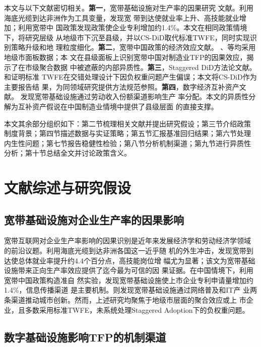 \documentclass[12pt, a4paper]{article}
\begin{document}
本文与以下文献密切相关。\textbf{第一}，宽带基础设施对生产率的因果研究
文献。\citet{hjort2019arrival}利用海底光缆到达非洲作为工具变量，发现宽
带到达使就业率上升、高技能就业增加；\citet{cui2022broadband}利用宽带中
国政策发现政策使企业专利增加约1.4\%。本文在相同政策情境下，将研究层级
从地级市下沉至县级，并以CS-DiD取代标准TWFE，同时实现识别策略升级和地
理粒度细化。\textbf{第二}，宽带中国政策的经济效应文献。
\citet{tan2022digital}、\citet{zhao2024city}等均采用地级市面板数据；本
文在县级面板上识别宽带中国对制造业TFP的因果效应，揭示了在市级聚合数据
中被遮蔽的内部异质性。\textbf{第三}，Staggered DiD方法论文献。
\citet{callaway2021difference}和\citet{goodman2021difference}证明标准
TWFE在交错处理设计下因负权重问题产生偏误；本文将CS-DiD作为主要报告结
果，为同领域研究提供方法规范参照。\textbf{第四}，数字经济互补资产文献。
\citet{liang2024broadband}发现宽带基础设施通过劳动收入份额渠道影响生产
率分配。本文的异质性分解为互补资产假说在中国制造业情境中提供了县级层面
的直接支撑。

本文其余部分组织如下：第二节梳理相关文献并提出研究假设；第三节介绍政策
制度背景；第四节描述数据与实证策略；第五节汇报基准回归结果；第六节处理
内生性问题；第七节报告稳健性检验；第八节分析机制渠道；第九节进行异质性
分析；第十节总结全文并讨论政策含义。

\section{文献综述与研究假设}

\subsection{宽带基础设施对企业生产率的因果影响}

宽带互联网对企业生产率影响的因果识别是近年来发展经济学和劳动经济学领域
的前沿议题。\citet{hjort2019arrival}利用海底光缆到达非洲各国这一近乎随
机的外生冲击，发现宽带到达使总体就业率提升约4.4个百分点，高技能岗位增
幅尤为显著；该文为宽带基础设施带来正向生产率效应提供了迄今最为可信的因
果证据。在中国情境下，\citet{cui2022broadband}利用宽带中国政策构造准自
然实验，发现宽带基础设施使上市企业专利申请量增加约1.4\%，信息传播渠道
是主要机制。\citet{tan2022digital}则发现宽带基础设施通过网络普及和IT产
业两条渠道推动城市创新。然而，上述研究均聚焦于地级市层面的聚合效应或上
市企业，且多数采用标准TWFE，未系统处理Staggered Adoption下的负权重问题。

\subsection{数字基础设施影响TFP的机制渠道}
\end{document}
